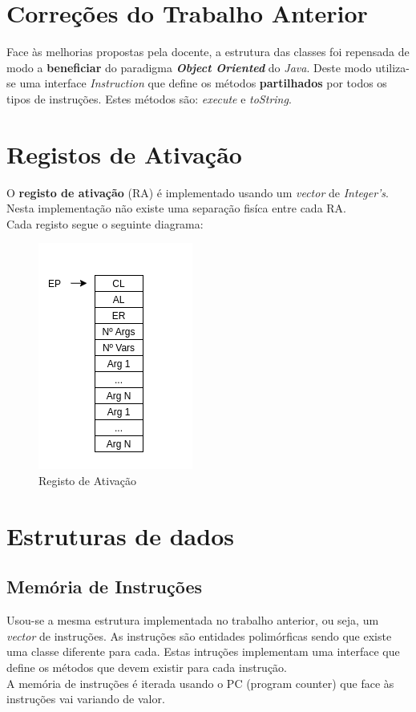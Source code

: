 \documentclass[a4paper,12pt,headings=small]{article}
\begin{document}
\section{Correções do Trabalho Anterior}
\FloatBarrier
Face às melhorias propostas pela docente, a estrutura das classes foi repensada de modo a \textbf{beneficiar} do paradigma \textit{\textbf{Object Oriented}} do \textit{Java}. Deste modo utiliza-se uma interface \textit{Instruction} que define os métodos \textbf{partilhados} por todos os tipos de instruções. Estes métodos são: \textit{execute} e \textit{toString}.


\section{Registos de Ativação}
\FloatBarrier
O \textbf{registo de ativação} (RA) é implementado usando um \textit{vector} de \textit{Integer's}. Nesta implementação não existe uma separação fisíca entre cada RA.\\
Cada registo segue o seguinte diagrama:

\FloatBarrier
\begin{figure}[h]
    \centering
    \includegraphics[scale=1]{RA.png}
    \caption{Registo de Ativação}
    \label{fig:my_label}
\end{figure}

\newpage


\section{Estruturas de dados}
\subsection{Memória de Instruções}
\FloatBarrier
Usou-se a mesma estrutura implementada no trabalho anterior, ou seja, um \textit{vector} de instruções. As instruções são entidades polimórficas sendo que existe uma classe diferente para cada. Estas intruções implementam uma interface que define os métodos que devem existir para cada instrução.\\
A memória de instruções é iterada usando o PC (program counter) que face às instruções vai variando de valor.
\end{document}
